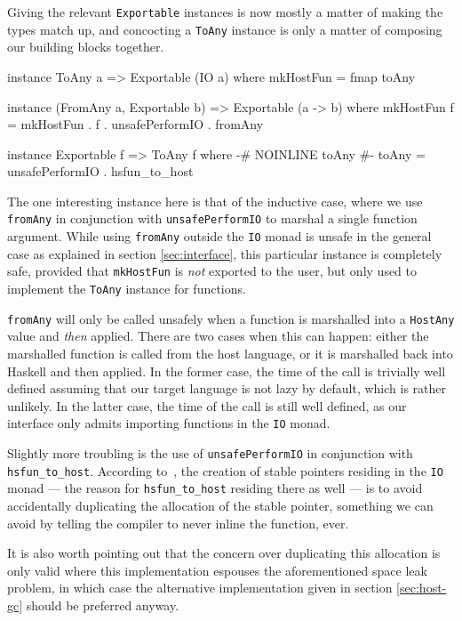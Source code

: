 \documentclass[preprint]{sigplanconf}
\begin{document}
Giving the relevant \lstinline!Exportable! instances is now mostly a matter of
making the types match up, and concocting a \lstinline!ToAny! instance is only
a matter of composing our building blocks together.

\begin{code}
  instance ToAny a => Exportable (IO a) where
    mkHostFun = fmap toAny

  instance (FromAny a, Exportable b) =>
            Exportable (a -> b) where
    mkHostFun f =
      mkHostFun . f . unsafePerformIO . fromAny
  
  instance Exportable f => ToAny f where
    {-# NOINLINE toAny #-}
    toAny = unsafePerformIO . hsfun_to_host
\end{code}

The one interesting instance here is that of the inductive case, where we use
\lstinline!fromAny! in conjunction with \lstinline!unsafePerformIO! to marshal
a single function argument. While using \lstinline!fromAny! outside the
\lstinline!IO! monad is unsafe in the general case as explained in section
\ref{sec:interface}, this particular instance is completely safe, provided that
\lstinline!mkHostFun! is \emph{not} exported to the user, but only used to
implement the \lstinline!ToAny! instance for functions.

\lstinline!fromAny! will only be called unsafely when a function is marshalled
into a \lstinline!HostAny! value and \emph{then} applied. There are two cases
when this can happen: either the marshalled function is called from the host
language, or it is marshalled back into Haskell and then applied.
In the former case, the time of the call is trivially well defined assuming
that our target language is not lazy by default, which is rather unlikely.
In the latter case, the time of the call is still well defined, as our
interface only admits importing functions in the \lstinline!IO! monad.

Slightly more troubling is the use of \lstinline!unsafePerformIO! in
conjunction with \lstinline!hsfun_to_host!.
According to\ \cite{stableptr}, the creation of stable pointers residing in
the \lstinline!IO! monad --- the reason for \lstinline!hsfun_to_host! residing
there as well --- is to avoid accidentally duplicating the allocation of the
stable pointer, something we can avoid by telling the compiler to never
inline the function, ever.

It is also worth pointing out that the concern over duplicating this allocation
is only valid where this implementation espouses the aforementioned space leak
problem, in which case the alternative implementation given in section
\ref{sec:host-gc} should be preferred anyway.
\end{document}
